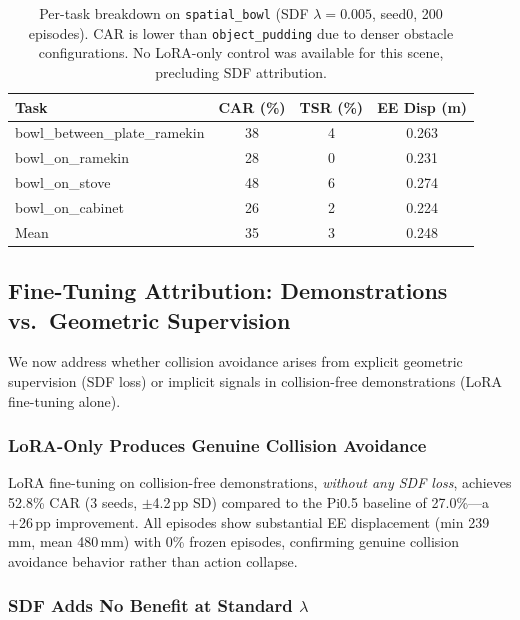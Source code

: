 \documentclass[letterpaper]{article}
\begin{document}
\begin{table}[t]
\centering
\caption{Per-task breakdown on \texttt{spatial\_bowl} (SDF $\lambda{=}0.005$, seed0, 200 episodes). CAR is lower than \texttt{object\_pudding} due to denser obstacle configurations. No LoRA-only control was available for this scene, precluding SDF attribution.}
\label{tab:spatial-bowl}
\begin{tabular}{lccc}
\toprule
Task & CAR (\%) & TSR (\%) & EE Disp (m) \\
\midrule
bowl\_between\_plate\_ramekin & 38 & 4 & 0.263 \\
bowl\_on\_ramekin & 28 & 0 & 0.231 \\
bowl\_on\_stove & 48 & 6 & 0.274 \\
bowl\_on\_cabinet & 26 & 2 & 0.224 \\
\midrule
Mean & 35 & 3 & 0.248 \\
\bottomrule
\end{tabular}
\end{table}


\subsection{Fine-Tuning Attribution: Demonstrations vs.\ Geometric Supervision}
\label{sec:attribution}

We now address whether collision avoidance arises from explicit geometric supervision (SDF loss) or implicit signals in collision-free demonstrations (LoRA fine-tuning alone).

\subsubsection{LoRA-Only Produces Genuine Collision Avoidance}

LoRA fine-tuning on collision-free demonstrations, \emph{without any SDF loss}, achieves 52.8\% CAR (3 seeds, $\pm$4.2\,pp SD) compared to the Pi0.5 baseline of 27.0\%---a +26\,pp improvement. All episodes show substantial EE displacement (min 239\,mm, mean 480\,mm) with 0\% frozen episodes, confirming genuine collision avoidance behavior rather than action collapse.

\subsubsection{SDF Adds No Benefit at Standard $\lambda$}
\end{document}
